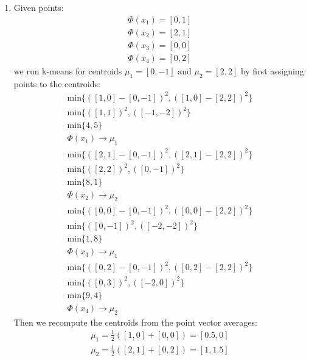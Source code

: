 \documentclass[12pt]{article}
\begin{document}
	\begin{enumerate}[label=(\alph*)]
		\item Given points:
			\begin{gather*}
				\Phi(x_1) = [0, 1] \\
				\Phi(x_2) = [2, 1] \\
				\Phi(x_3) = [0, 0] \\
				\Phi(x_4) = [0, 2]
			\end{gather*}
			we run k-means for centroids
			\(\mu_1 = [0, -1] \text{ and } \mu_2 = [2, 2]\)
			by first assigning points to the centroids:
			\begin{gather*}
				\text{min} \{ ( [1,0] - [0, -1] )^2, ( [1,0] - [2, 2] )^2\} \\
				\text{min} \{ ( [1,1] )^2, ( [-1, -2] )^2\} \\
				\text{min} \{ 4, 5\} \\
				\Phi(x_1) \rightarrow \mu_1
			\end{gather*}
			\begin{gather*}
				\text{min} \{ ( [2,1] - [0, -1] )^2, ( [2,1] - [2, 2] )^2\} \\
				\text{min} \{ ( [2,2] )^2, ( [0, -1] )^2\} \\
				\text{min} \{ 8, 1\} \\
				\Phi(x_2) \rightarrow \mu_2
			\end{gather*}
			\begin{gather*}
				\text{min} \{ ( [0,0] - [0, -1] )^2, ( [0,0] - [2, 2] )^2\} \\
				\text{min} \{ ( [0,-1] )^2, ( [-2, -2] )^2\} \\
				\text{min} \{ 1, 8\} \\
				\Phi(x_3) \rightarrow \mu_1
			\end{gather*}
			\begin{gather*}
				\text{min} \{ ( [0,2] - [0, -1] )^2, ( [0,2] - [2, 2] )^2\} \\
				\text{min} \{ ( [0,3] )^2, ( [-2, 0] )^2\} \\
				\text{min} \{ 9, 4\} \\
				\Phi(x_4) \rightarrow \mu_2
			\end{gather*}
			Then we recompute the centroids from the point vector averages:
			\begin{gather*}
				\mu_1 = \frac{1}{2} ( [1,0] + [0, 0] ) =  [0.5, 0] \\
				\mu_2 = \frac{1}{2} ( [2,1] + [0, 2] ) =  [1, 1.5] \\
			\end{gather*}

\end{enumerate}
\end{document}
